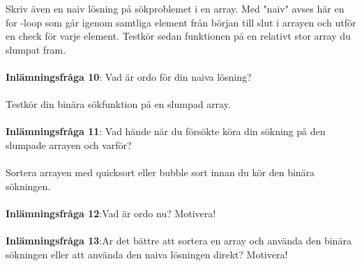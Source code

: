 \documentclass{article}
\begin{document}
Skriv även en naiv lösning på sökproblemet i en array. Med "naiv" avses här en for -loop
som går igenom samtliga element från början till slut i arrayen och utför en check för
varje element. Testkör sedan funktionen på en relativt stor array du slumpat fram. \\\\
\textbf{Inlämningsfråga 10}: Vad är ordo för din naiva lösning? \\\\
Testkör din binära sökfunktion på en slumpad array. 
\\\\

\textbf{Inlämningsfråga 11}: Vad hände när du försökte köra din sökning på den slumpade arrayen och varför?\\\\
Sortera arrayen med quicksort eller bubble sort innan du kör den binära sökningen. \\\\
\textbf{Inlämningsfråga 12}:Vad är ordo nu? Motivera! \\\\
\textbf{Inlämningsfråga 13}:Ar det bättre att sortera en array och använda den binära sökningen eller att använda
den naiva lösningen direkt? Motivera!
\end{document}
